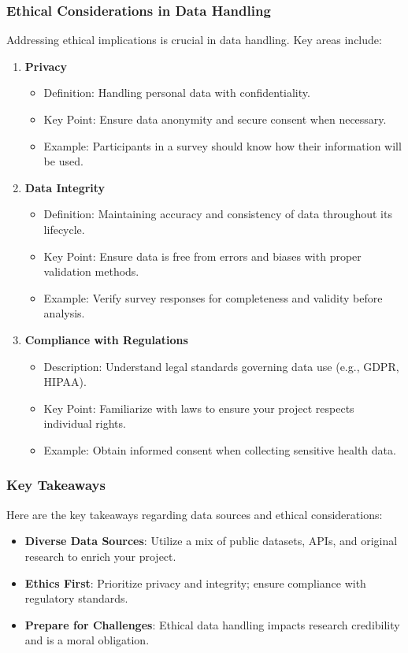 \documentclass[aspectratio=169]{beamer}
\begin{document}
\begin{frame}[fragile]
    \frametitle{Ethical Considerations in Data Handling}
    Addressing ethical implications is crucial in data handling. Key areas include:
    
    \begin{enumerate}
        \item \textbf{Privacy}
        \begin{itemize}
            \item Definition: Handling personal data with confidentiality.
            \item Key Point: Ensure data anonymity and secure consent when necessary.
            \item Example: Participants in a survey should know how their information will be used.
        \end{itemize}
        
        \item \textbf{Data Integrity}
        \begin{itemize}
            \item Definition: Maintaining accuracy and consistency of data throughout its lifecycle.
            \item Key Point: Ensure data is free from errors and biases with proper validation methods.
            \item Example: Verify survey responses for completeness and validity before analysis.
        \end{itemize}
        
        \item \textbf{Compliance with Regulations}
        \begin{itemize}
            \item Description: Understand legal standards governing data use (e.g., GDPR, HIPAA).
            \item Key Point: Familiarize with laws to ensure your project respects individual rights.
            \item Example: Obtain informed consent when collecting sensitive health data.
        \end{itemize}
    \end{enumerate}
\end{frame}

\begin{frame}[fragile]
    \frametitle{Key Takeaways}
    Here are the key takeaways regarding data sources and ethical considerations:
    
    \begin{itemize}
        \item \textbf{Diverse Data Sources}: Utilize a mix of public datasets, APIs, and original research to enrich your project.
        \item \textbf{Ethics First}: Prioritize privacy and integrity; ensure compliance with regulatory standards.
        \item \textbf{Prepare for Challenges}: Ethical data handling impacts research credibility and is a moral obligation.
    \end{itemize}
\end{frame}
\end{document}
